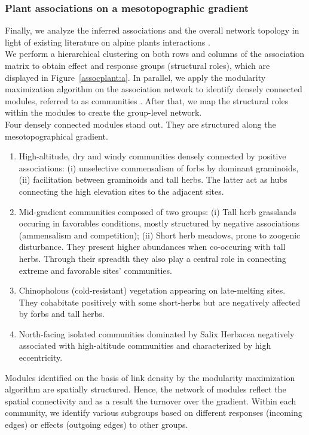 \documentclass[10pt,a4paper]{article}
\begin{document}
\subsubsection{Plant associations on a mesotopographic gradient}
Finally, we analyze the inferred associations and the overall network topology in light of existing literature on alpine plants interactions \cite{choler2001facilitation}.\\

We perform a hierarchical clustering on both rows and columns of the association matrix to obtain effect and response groups (structural roles), which are displayed in Figure~\ref{assocplant:a}. In parallel, we apply the modularity maximization algorithm on the association network to identify densely connected modules, referred to as communities \cite{gauzens2015trophic}. After that, we map the structural roles within the modules to create the group-level network.\\

Four densely connected modules stand out. They are structured along the mesotopographical gradient. 
\begin{enumerate}
	\item High-altitude, dry and windy communities densely connected by positive associations: (i) unselective commensalism of forbs by dominant graminoids, (ii) facilitation between graminoids and tall herbs. The latter act as hubs connecting the high elevation sites to the adjacent sites. 
	\item Mid-gradient communities composed of two groups: (i) Tall herb grasslands occuring in favorables conditions, mostly structured by negative associations (ammensalism and competition); (ii) Short herb meadows, prone to zoogenic disturbance. They present higher abundances when co-occuring with tall herbs. Through their spreadth they also play a central role in connecting extreme and favorable sites' communities. 
	\item Chinopholous (cold-resistant) vegetation appearing on late-melting sites. They cohabitate positively with some short-herbs but are negatively affected by forbs and tall herbs. 
	\item North-facing isolated communities dominated by Salix Herbacea negatively associated with high-altitude communities and characterized by high eccentricity.
\end{enumerate}

Modules identified on the basis of link density by the modularity maximization algorithm are spatially structured. Hence, the network of modules reflect the spatial connectivity and as a result the turnover over the gradient. Within each community, we identify various subgroups based on different responses (incoming edges) or effects (outgoing edges) to other groups.\\
\end{document}

